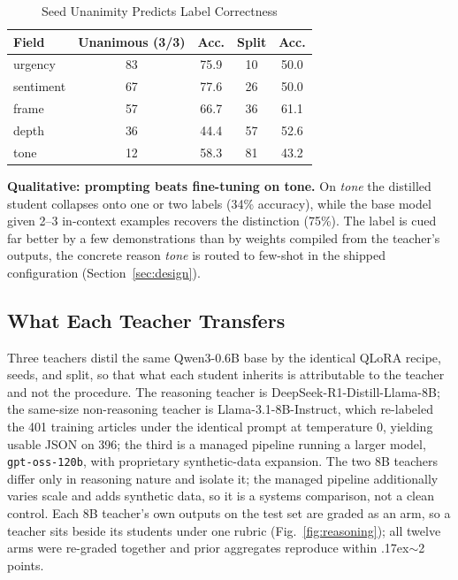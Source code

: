 \documentclass[10pt,journal]{IEEEtran}
\begin{document}
\begin{table}[t]
\centering
\caption{Seed Unanimity Predicts Label Correctness}
\label{tab:seeds}
\small
\begin{tabular}{@{}lcccc@{}}
\toprule
Field & Unanimous (3/3) & Acc. & Split & Acc. \\
\midrule
urgency & 83 & 75.9 & 10 & 50.0 \\
sentiment & 67 & 77.6 & 26 & 50.0 \\
frame & 57 & 66.7 & 36 & 61.1 \\
depth & 36 & 44.4 & 57 & 52.6 \\
tone & 12 & 58.3 & 81 & 43.2 \\
\bottomrule
\end{tabular}
\end{table}

\textbf{Qualitative: prompting beats fine-tuning on tone.} On \emph{tone} the distilled student collapses onto one or two labels (34\% accuracy), while the base model given 2--3 in-context examples recovers the distinction (75\%). The label is cued far better by a few demonstrations than by weights compiled from the teacher's outputs, the concrete reason \emph{tone} is routed to few-shot in the shipped configuration (Section~\ref{sec:design}).

\subsection{What Each Teacher Transfers}\label{sec:reasoning}
Three teachers distil the same Qwen3-0.6B base by the identical QLoRA recipe, seeds, and split, so that what each student inherits is attributable to the teacher and not the procedure. The reasoning teacher is DeepSeek-R1-Distill-Llama-8B; the same-size non-reasoning teacher is Llama-3.1-8B-Instruct, which re-labeled the 401 training articles under the identical prompt at temperature 0, yielding usable JSON on 396; the third is a managed pipeline running a larger model, \texttt{gpt-oss-120b}, with proprietary synthetic-data expansion. The two 8B teachers differ only in reasoning nature and isolate it; the managed pipeline additionally varies scale and adds synthetic data, so it is a systems comparison, not a clean control. Each 8B teacher's own outputs on the test set are graded as an arm, so a teacher sits beside its students under one rubric (Fig.~\ref{fig:reasoning}); all twelve arms were re-graded together and prior aggregates reproduce within {\raise.17ex\hbox{$\scriptstyle\sim$}}2 points.
\end{document}
